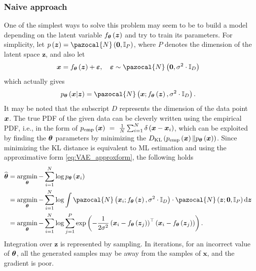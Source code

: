 \subsubsection{Naive approach}
One of the simplest ways to solve this problem may seem to be to build a model depending on the latent variable $f_{\boldsymbol{\theta}}\left(\boldsymbol{z}\right)$ and try to train its parameters. For simplicity, let $p\left(\boldsymbol{z} \right) = \pazocal{N}\left(\boldsymbol{0}, \mathbb{I}_P\right)$, where $P$ denotes the dimension of the latent space $\boldsymbol{z}$, and also let
\begin{equation}
\bx = f_{\bt}\left(\boldsymbol{z}\right) + \boldsymbol{\varepsilon}, \quad \boldsymbol{\varepsilon} \sim \pazocal{N}\left(\boldsymbol{0},\sigma^2\cdot\mathbb{I}_D \right)
\end{equation}
which actually gives 
\begin{equation}\label{eq:VAE_decoder}
p_{\bt}\left(\bx\vert\boldsymbol{z}\right) = \pazocal{N}\left(\boldsymbol{x};f_{\bt}\left(\boldsymbol{z}\right),\sigma^2\cdot\mathbb{I}_D \right).
\end{equation}
It may be noted that the subscript $D$ represents the dimension of the data point $\boldsymbol{x}$. The true PDF of the given data can be cleverly written using the empirical PDF, i.e., in the form of $p_{\mathrm{emp}}\left(\boldsymbol{x} \right)~=~\frac{1}{N}\sum_{i=1}^N\delta\left(\boldsymbol{x} - \boldsymbol{x}_i\right) $,
which can be exploited by finding the $\boldsymbol{\theta}$ parameters by minimizing the $D_{\mathrm{KL}} \left(p_{\mathrm{emp}}\left(\boldsymbol{x} \right) \Vert p_{\boldsymbol{\theta}}\left(\boldsymbol{x}\right) \right)$. Since minimizing the KL distance is equivalent to ML estimation and using the approximative form \eqref{eq:VAE_approxform}, the following holds 
\begin{align}
    \widehat{\boldsymbol{\bt}} &= \argmin_{\boldsymbol{\bt}}- \sum_{i=1}^N\log p_{\boldsymbol{\bt}}\left(\boldsymbol{x}_i \right)\\
    &=  \argmin_{\boldsymbol{\bt}}- \sum_{i=1}^N \log \int \pazocal{N}\left(\boldsymbol{x}_i;f_{\bt}\left(\boldsymbol{z}\right),\sigma^2\cdot\mathbb{I}_D \right) \cdot \pazocal{N}\left(\boldsymbol{z};\boldsymbol{0}, \mathbb{I}_P\right) \d{\boldsymbol{z}}\\
    &= \argmin_{\boldsymbol{\bt}}- \sum_{i=1}^N \log \sum_{j=1}^{P}\exp\left(-\frac{1}{2\sigma^2}\left(\bx_i-f_{\bt}\left(\boldsymbol{z}_j\right)\right)^\top\left(\bx_i-f_{\bt}\left(\boldsymbol{z}_j\right)\right) \right).
\end{align}
Integration over $\boldsymbol{z}$ is represented by sampling. In iterations, for an incorrect value of $\boldsymbol{\theta}$, all the generated samples may
be away from the samples of $\boldsymbol{x}$, and the gradient is poor.


